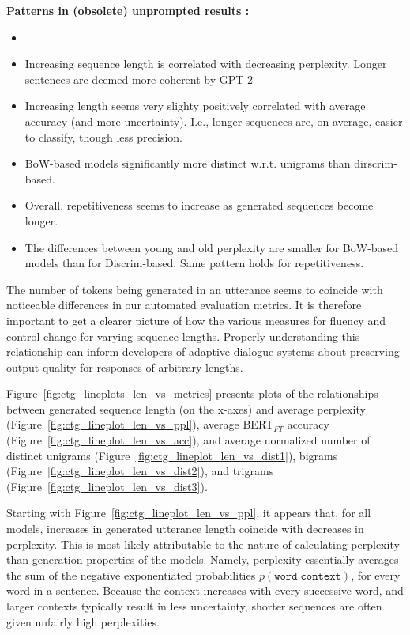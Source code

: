 \textbf{Patterns in (obsolete) unprompted results :}
\begin{itemize}
    \item {}
    \item Increasing sequence length is correlated with decreasing perplexity. Longer sentences are deemed more coherent by GPT-2
    \item Increasing length seems very slighty positively correlated with average accuracy (and more uncertainty). I.e., longer sequences are, on average, easier to classify, though less precision.
    \item BoW-based models significantly more distinct  w.r.t. unigrams than dirscrim-based.
    \item Overall, repetitiveness seems to increase as generated sequences become longer.
    \item The differences between young and old perplexity are smaller for BoW-based models than for Discrim-based. Same pattern holds for repetitiveness.
\end{itemize}


The number of tokens being generated in an utterance seems to coincide with noticeable differences in our automated evaluation metrics. It is therefore important to get a clearer picture of how the various measures for fluency and control change for varying sequence lengths. Properly understanding this relationship can inform developers of adaptive dialogue systems about preserving output quality for responses of arbitrary lengths.

Figure~\ref{fig:ctg_lineplots_len_vs_metrics} presents plots of the relationships between generated sequence length (on the x-axes) and average perplexity (Figure~\ref{fig:ctg_lineplot_len_vs_ppl}), average BERT$_{FT}$ accuracy (Figure~\ref{fig:ctg_lineplot_len_vs_acc}), and average normalized number of distinct unigrams (Figure~\ref{fig:ctg_lineplot_len_vs_dist1}), bigrams (Figure~\ref{fig:ctg_lineplot_len_vs_dist2}), and trigrams (Figure~\ref{fig:ctg_lineplot_len_vs_dist3}).


Starting with Figure~\ref{fig:ctg_lineplot_len_vs_ppl}, it appears that, for all models, increases in generated utterance length coincide with decreases in perplexity. This is most likely attributable to the nature of calculating perplexity than generation properties of the models. Namely, perplexity essentially averages the sum of the negative exponentiated probabilities $p(\texttt{word} | \texttt{context})$, for every word in a sentence. Because the context increases with every successive word, and larger contexts typically result in less uncertainty, shorter sequences are often given unfairly high perplexities.


